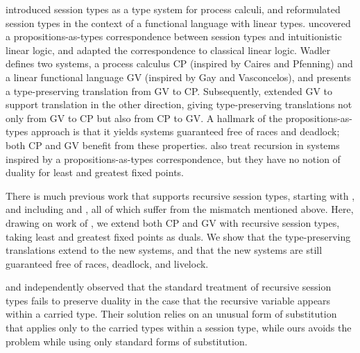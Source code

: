 \documentclass[orivec,envcountsame]{llncs}
\begin{document}
\citet{Honda93} introduced session types as a type system for process calculi, and
\citet{GayVasconcelos10} reformulated session types in the context of a functional language with
linear types. \citet{CairesPfenning10} uncovered a propositions-as-types correspondence between
session types and intuitionistic linear logic, and \citet{Wadler12} adapted the correspondence to
classical linear logic. Wadler defines two systems, a process calculus CP (inspired by Caires and
Pfenning) and a linear functional language GV (inspired by Gay and Vasconcelos), and presents a
type-preserving translation from GV to CP. Subsequently, \citet{LindleyM14} extended GV to support
translation in the other direction, giving type-preserving translations not only from GV to CP but
also from CP to GV. A hallmark of the propositions-as-types approach is that it yields systems
guaranteed free of races and deadlock; both CP and GV benefit from these properties.
\citet{Toninho13,Toninho14} also treat recursion in systems inspired by a propositions-as-types
correspondence, but they have no notion of duality for least and greatest fixed points.

There is much previous work that supports recursive session types, starting with \citet{Honda98},
and including \citet{Yoshida07} and \citet{DemangeonH11}, all of which suffer from the mismatch
mentioned above. Here, drawing on work of \citet{Baelde12}, we extend both CP and GV with recursive
session types, taking least and greatest fixed points as duals. We show that the type-preserving
translations extend to the new systems, and that the new systems are still guaranteed free of races,
deadlock, and livelock.

\citet{Bono12} and \citet{Bernardi13} independently observed that the standard treatment of recursive
session types fails to preserve duality in the case that the recursive variable appears within a
carried type.  Their solution relies on an unusual form of substitution that applies only to the
carried types within a session type, while ours avoids the problem while using only standard forms
of substitution.
\end{document}
